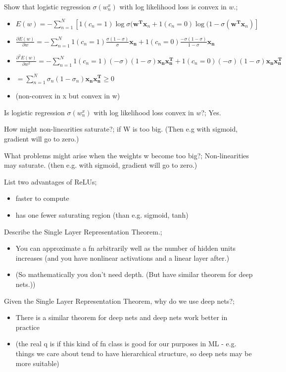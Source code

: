 \documentclass{article}
\begin{document}
Show that logistic regression $\sigma(w^x_n)$ with log likelihood loss is convex in $w$.; \begin{itemize}
    \item $E(w)=-\sum_{n=1}^N [1(c_n=1)\log \sigma(\mathbf{w^Tx}_n + 1(c_n=0)\log(1-\sigma(\mathbf{w^Tx}_n)]$
    \item $\frac{\partial E(w)}{\partial w} = -\sum_{n=1}^N 1(c_n=1)\frac{\sigma(1-\sigma)}{\sigma}\mathbf{x_n} + 1(c_n=0)\frac{-\sigma(1-\sigma)}{1-\sigma}\mathbf{x_n}$
    \item $\frac{\partial^2E(w)}{\partial w^2} = -\sum_{n=1}^N 1(c_n = 1)(-\sigma)(1-\sigma)\mathbf{x_nx_n^T}+1(c_n=0)(-\sigma)(1-\sigma)\mathbf{x_nx_n^T}$
    \item $=\sum_{n=1}^N \sigma_n(1-\sigma_n)\mathbf{x_nx_n^T}\geq 0$
    \item (non-convex in x but convex in w)
\end{itemize}

Is logistic regression $\sigma(w^x_n)$ with log likelihood loss convex in $w$?; Yes.

How might non-linearities saturate?; if W is too big. (Then e.g with sigmoid, gradient will go to zero.)

What problems might arise when the weights w become too big?; Non-linearities may saturate. (then e.g. with sigmoid, gradient will go to zero.)

List two advantages of ReLUs; \begin{itemize}
    \item faster to compute
    \item has one fewer saturating region (than e.g. sigmoid, tanh)
\end{itemize}

Describe the Single Layer Representation Theorem.; \begin{itemize}
    \item You can approximate a fn arbitrarily well as the number of hidden units increases (and you have nonlinear activations and a linear layer after.)
    \item (So mathematically you don't need depth. (But have similar theorem for deep nets.))
\end{itemize}

Given the Single Layer Representation Theorem, why do we use deep nets?; \begin{itemize}
    \item There is a similar theorem for deep nets and deep nets work better in practice
    \item (the real q is if this kind of fn class is good for our purposes in ML - e.g. things we care about tend to have hierarchical structure, so deep nets may be more suitable)
\end{itemize}
\end{document}
